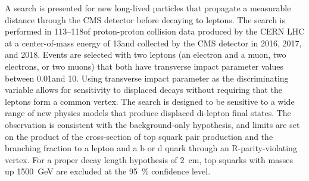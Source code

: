
A search is presented for new long-lived particles that propagate a measurable distance through the CMS detector before decaying to leptons. The search is performed in 113--118\fbinv of proton-proton collision data produced by the CERN LHC at a center-of-mass energy of 13\TeV and collected by the CMS detector in 2016, 2017, and 2018. Events are selected with two leptons (an electron and a muon, two electrons, or two muons) that both have transverse impact parameter values between 0.01\cm and 10\cm. Using transverse impact parameter as the discriminating variable allows for sensitivity to displaced decays without requiring that the leptons form a common vertex. The search is designed to be sensitive to a wide range of new physics models that produce displaced di-lepton final states. The observation is consistent with the background-only hypothesis, and limits are set on the product of the cross-section of top squark pair production and the branching fraction to a lepton and a b or d quark through an R-parity-violating vertex. For a proper decay length hypothesis of \SI{2}{\cm}, top squarks with masses up \SI{1500}{\GeV} are excluded at the \SI{95}{\percent} confidence level.

